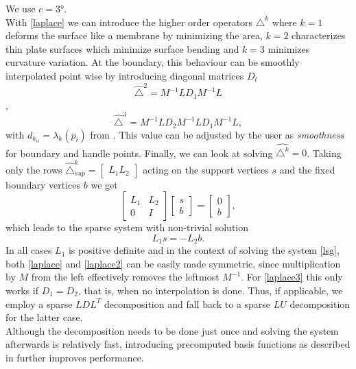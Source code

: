 \documentclass[twocolumn]{article}
\begin{document}
We use $c = \ang{3}$.\\
With \eqref{laplace} we can introduce the higher order operators $\triangle^k$ where $k=1$ deforms the surface like a membrane by minimizing the area, $k=2$ characterizes thin plate surfaces which minimize
surface bending and $k=3$ minimizes curvature variation. At the boundary, this behaviour can be smoothly interpolated point wise by introducing diagonal matrices $D_l$ 
\begin{equation}\label{laplace2}
\hat{\triangle}^2 = M^{-1} L D_1 M^{-1} L
\end{equation} ,
\begin{equation}\label{laplace3}
\hat{\triangle}^3 = M^{-1}LD_2 M^{-1} L D_1 M^{-1} L,
\end{equation}
with $d_{k_{ii}} = \lambda_k(p_i)$ from \cite{botsch2004intuitive}.
This value can be adjusted by the user as \textit{smoothness} for boundary and handle points.
Finally, we can look at solving $\hat{\triangle^k} = 0$. Taking only the rows $\hat{\triangle}^k_{sup} = \begin{bmatrix}L_1 L_2\end{bmatrix}$ acting on the support vertices $s$ and the fixed boundary vertices $b$ we get
\begin{equation*}
\begin{bmatrix}L_1 & L_2 \\ 0 & I\end{bmatrix} \begin{bmatrix}s \\ b\end{bmatrix} = \begin{bmatrix} 0 \\ b \end{bmatrix},
\end{equation*}
which leads to the sparse system with non-trivial solution
\begin{equation}\label{lsg}
L_1 s = -L_2 b.
\end{equation}
In all cases $L_1$ is positive definite and in the context of solving the system \eqref{lsg}, both \eqref{laplace} and \eqref{laplace2} can be easily made symmetric, since multiplication by $M$ from the left effectively removes the leftmost $M^{-1}$. For \eqref{laplace3} this only works if $D_1 = D_2$, that is, when no interpolation is done. Thus, if applicable, we employ a sparse $LDL^T$ decomposition and fall back to a sparse $LU$ decomposition for the latter case. \\
Although the decomposition needs to be done just once and solving the system afterwards is relatively fast, introducing precomputed basis functions as described in \cite{botsch2004intuitive} further improves performance.
\end{document}
